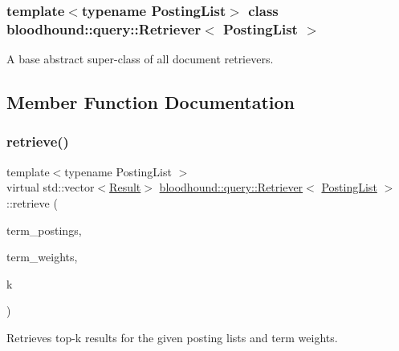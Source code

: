 \subsubsection*{template$<$typename Posting\+List$>$\newline
class bloodhound\+::query\+::\+Retriever$<$ Posting\+List $>$}

A base abstract super-\/class of all document retrievers. 

\subsection{Member Function Documentation}
\mbox{\label{classbloodhound_1_1query_1_1Retriever_ae3c6a4628c5580e620c213b3dcd47c2b}} 
\subsubsection{\texorpdfstring{retrieve()}{retrieve()}}
{\footnotesize\ttfamily template$<$typename Posting\+List $>$ \\
virtual std\+::vector$<$\mbox{\hyperlink{structbloodhound_1_1query_1_1Result}{Result}}$>$ \mbox{\hyperlink{classbloodhound_1_1query_1_1Retriever}{bloodhound\+::query\+::\+Retriever}}$<$ \mbox{\hyperlink{classbloodhound_1_1PostingList}{Posting\+List}} $>$\+::retrieve (\begin{DoxyParamCaption}\item[{const std\+::vector$<$ \mbox{\hyperlink{classbloodhound_1_1PostingList}{Posting\+List}} $>$ \&}]{term\+\_\+postings,  }\item[{const std\+::vector$<$ \mbox{\hyperlink{structbloodhound_1_1Score}{Score}} $>$ \&}]{term\+\_\+weights,  }\item[{std\+::size\+\_\+t}]{k }\end{DoxyParamCaption})\hspace{0.3cm}{\ttfamily [pure virtual]}}



Retrieves top-\/k results for the given posting lists and term weights. 



